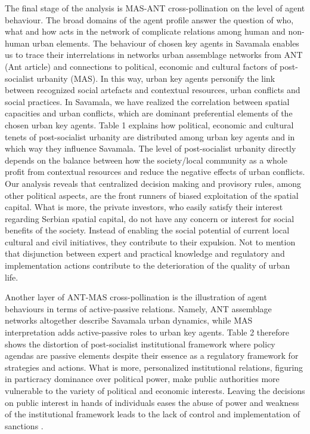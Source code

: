 \documentclass[11pt]{report}
\begin{document}
The final stage of the analysis is MAS-ANT cross-pollination on the level of agent behaviour. The broad  domains  of  the  agent  profile  answer  the  question  of  who,  what  and  how  acts  in  the  network  of complicate relations among human and non-human urban elements. The behaviour of chosen key agents in Savamala enables us to trace their interrelations in networks {urban assemblage networks from ANT (Ant article)} and connections to political, economic and cultural factors of post-socialist urbanity (MAS). In this way, urban key agents personify the link between recognized social artefacts and contextual resources, urban conflicts and social practices. In Savamala, we have realized the correlation between spatial capacities and urban conflicts, which are dominant preferential elements of the chosen urban key agents. Table 1 explains how political, economic and cultural tenets of post-socialist urbanity are distributed among urban key agents and in which way they influence Savamala.
The level of post-socialist urbanity directly depends on the balance between how the society/local community as a whole profit from contextual resources and reduce the negative effects of urban conflicts. Our analysis reveals that centralized decision making and provisory rules, among other political aspects, are the front runners of biased exploitation of the spatial capital. What is more, the private investors, who easily satisfy their interest regarding Serbian spatial capital, do not have any concern or interest for social benefits of the society. Instead of enabling the social potential of current local cultural and civil initiatives, they contribute to their expulsion. Not to mention that disjunction between expert and practical knowledge and regulatory and implementation actions contribute to the deterioration of the quality of urban life.

Another layer of ANT-MAS cross-pollination is the illustration of agent behaviours in terms of active-passive relations. Namely, ANT assemblage networks altogether describe Savamala urban dynamics, while MAS interpretation adds active-passive roles to urban key agents. Table 2 therefore shows the distortion of post-socialist institutional framework where policy agendas are passive elements despite their essence as a regulatory framework for strategies and actions. What is more, personalized institutional relations, figuring in particracy dominance over political power, make public authorities more vulnerable to the variety of political and economic interests. Leaving the decisions on public interest in hands of individuals eases the abuse of power and weakness of the institutional framework leads to the lack of control and implementation of sanctions . 
 
\end{document}
